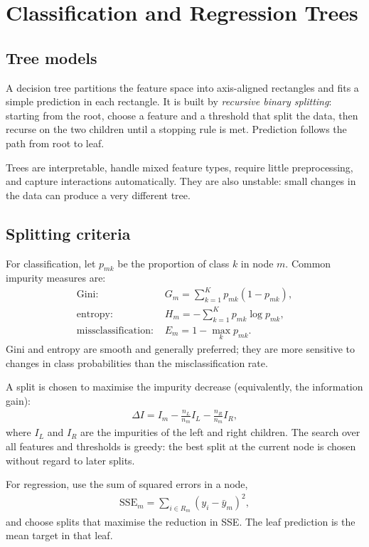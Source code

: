 \documentclass[a4paper, 12pt]{book}
\begin{document}

\chapter{Classification and Regression Trees}
\label{ch:trees}

\section{Tree models}

A decision tree partitions the feature space into axis-aligned rectangles and fits a
simple prediction in each rectangle. It is built by \emph{recursive binary
splitting}: starting from the root, choose a feature and a threshold that split the
data, then recurse on the two children until a stopping rule is met. Prediction
follows the path from root to leaf.

Trees are interpretable, handle mixed feature types, require little preprocessing,
and capture interactions automatically. They are also unstable: small changes in the
data can produce a very different tree.

\section{Splitting criteria}

For classification, let $p_{mk}$ be the proportion of class $k$ in node $m$. Common
impurity measures are:
\begin{align}
    \text{Gini: } & G_m = \sum_{k=1}^K p_{mk}(1-p_{mk}),\\
    \text{entropy: } & H_m = -\sum_{k=1}^K p_{mk}\log p_{mk},\\
    \text{missclassification: } & E_m = 1-\max_k p_{mk}.
\end{align}
Gini and entropy are smooth and generally preferred; they are more sensitive to
changes in class probabilities than the misclassification rate.

A split is chosen to maximise the impurity decrease (equivalently, the information
gain):
\begin{align}
    \Delta I
    = I_m - \frac{n_L}{n_m}I_L - \frac{n_R}{n_m}I_R,
\end{align}
where $I_L$ and $I_R$ are the impurities of the left and right children. The search
over all features and thresholds is greedy: the best split at the current node is
chosen without regard to later splits.

For regression, use the sum of squared errors in a node,
\begin{align}
    \mathrm{SSE}_m = \sum_{i \in R_m} (y_i - \bar{y}_m)^2,
\end{align}
and choose splits that maximise the reduction in SSE. The leaf prediction is the mean
target in that leaf.
\end{document}
